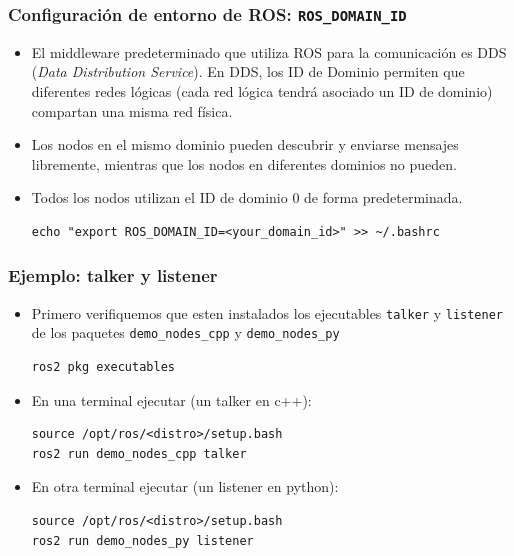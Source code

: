 \begin{frame}[fragile]
	\frametitle{Configuración de entorno de ROS: \lstinline[style=bash]{ROS_DOMAIN_ID}}

\begin{itemize}
    
    \item El middleware predeterminado que utiliza ROS para la comunicación es DDS (\emph{Data Distribution Service}). En DDS, los ID de Dominio permiten que diferentes redes lógicas (cada red lógica tendrá asociado un ID de dominio) compartan una misma red física.
    \item Los nodos en el mismo dominio pueden descubrir y enviarse mensajes libremente, mientras que los nodos en diferentes dominios no pueden.

    \item Todos los nodos utilizan el ID de dominio 0 de forma predeterminada.
    
\begin{lstlisting}[style=bash]
echo "export ROS_DOMAIN_ID=<your_domain_id>" >> ~/.bashrc
\end{lstlisting}
\end{itemize}

\end{frame}

\begin{frame}[fragile]
	\frametitle{Ejemplo: talker y listener}
	
    \begin{itemize}
        \item Primero verifiquemos que esten instalados los ejecutables \lstinline[style=bash]{talker} y \lstinline[style=bash]{listener} de los paquetes \lstinline[style=bash]{demo_nodes_cpp} y \lstinline[style=bash]{demo_nodes_py}
        
        \begin{lstlisting}[style=bash]
ros2 pkg executables
        \end{lstlisting}
        
	    \item En una terminal ejecutar (un talker en c++):
        \begin{lstlisting}[style=bash]
source /opt/ros/<distro>/setup.bash
ros2 run demo_nodes_cpp talker
        \end{lstlisting}

	    \item En otra terminal ejecutar (un listener en python):
        \begin{lstlisting}[style=bash]
source /opt/ros/<distro>/setup.bash
ros2 run demo_nodes_py listener
        \end{lstlisting}
    \end{itemize}

\end{frame}

